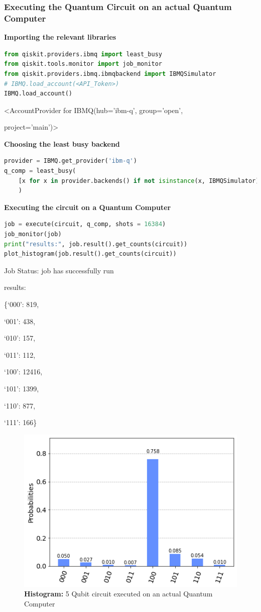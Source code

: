 \subsubsection{Executing the Quantum Circuit on an actual Quantum Computer}
\label{code:executing_the_quantum_circuit_on_a_quantum_computer}
\textbf{Importing the relevant libraries}
\label{code:importing_the_libraries_2}
\begin{lstlisting}[language=Python]
from qiskit.providers.ibmq import least_busy
from qiskit.tools.monitor import job_monitor
from qiskit.providers.ibmq.ibmqbackend import IBMQSimulator
# IBMQ.load_account(<API_Token>)
IBMQ.load_account()\end{lstlisting}
{\selectfont <AccountProvider for IBMQ(hub='ibm-q', group='open',\par
project='main')>}
\vspace{3mm}

\textbf{Choosing the least busy backend}

\begin{lstlisting}[language=Python]
provider = IBMQ.get_provider('ibm-q')
q_comp = least_busy(
	[x for x in provider.backends() if not isinstance(x, IBMQSimulator)]
	)\end{lstlisting}
\vspace{3mm}

\textbf{Executing the circuit on a Quantum Computer}

\begin{lstlisting}[language=Python]
job = execute(circuit, q_comp, shots = 16384)
job_monitor(job)
print("results:", job.result().get_counts(circuit))
plot_histogram(job.result().get_counts(circuit))\end{lstlisting}

{\selectfont
\noindent Job Status: job has successfully run

\noindent results:\par
\{`000': 819,\par
`001': 438,\par
`010': 157,\par
`011': 112,\par
`100': 12416,\par
`101': 1399,\par
`110': 877,\par
`111': 166\}}

\begin{figure}[h]%
	\centering
	\includegraphics[width=0.9\linewidth]{./images/5qubit_act.png}
	\caption{\textbf{Histogram:} 5 Qubit circuit executed on an actual Quantum Computer}%
	\label{fig:5qubit_act}%
\end{figure}